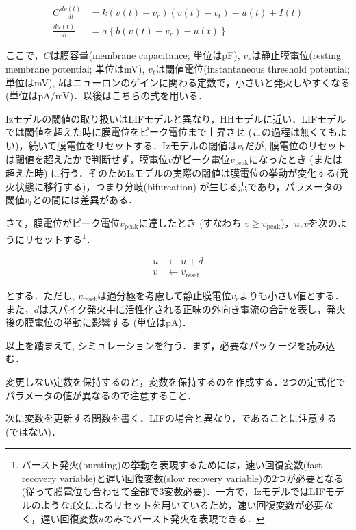 \begin{align}
C\frac{dv(t)}{dt}&=k\left(v(t)-v_r\right)\left(v(t)-v_t\right)-u(t)+I(t) \\
\frac{du(t)}{dt}&=a\left\{b\left(v(t)-v_{r}\right)-u(t)\right\}
\end{align} 


ここで，$C$は膜容量(membrane capacitance; 単位はpF), $v_r$は静止膜電位(resting membrane potential; 単位はmV), $v_t$は閾値電位(instantaneous threshold potential; 単位はmV), $k$はニューロンのゲインに関わる定数で，小さいと発火しやすくなる (単位はpA/mV)．以後はこちらの式を用いる．

Izモデルの閾値の取り扱いはLIFモデルと異なり，HHモデルに近い．LIFモデルでは閾値を超えた時に膜電位をピーク電位まで上昇させ (この過程は無くてもよい)，続いて膜電位をリセットする．Izモデルの閾値は$v_t$だが, 膜電位のリセットは閾値を超えたかで判断せず，膜電位$v$がピーク電位$v_{\text{peak}}$になったとき (または超えた時) に行う．そのためIzモデルの実際の閾値は膜電位の挙動が変化する(発火状態に移行する)，つまり分岐(bifurcation) が生じる点であり，パラメータの閾値$v_t$との間には差異がある．

さて，膜電位がピーク電位$v_{\text{peak}}$に達したとき (すなわち  $v \geq v_{\text{peak}}$)，$u, v$を次のようにリセットする\footnote{バースト発火(bursting)の挙動を表現するためには，速い回復変数(fast recovery variable)と遅い回復変数(slow recovery variable)の2つが必要となる(従って膜電位も合わせて全部で3変数必要)．一方で，IzモデルではLIFモデルのようなif文によるリセットを用いているため，速い回復変数が必要なく，遅い回復変数$u$のみでバースト発火を表現できる．}．


\begin{align} 
u&\leftarrow u+d\\
v&\leftarrow v_{\text{reset}}
\end{align}


とする．ただし, $v_{\text{reset}}$は過分極を考慮して静止膜電位$v_r$よりも小さい値とする．また，$d$はスパイク発火中に活性化される正味の外向き電流の合計を表し，発火後の膜電位の挙動に影響する (単位はpA)．

以上を踏まえて, シミュレーションを行う．まず，必要なパッケージを読み込む．

変更しない定数を保持するのと，変数を保持するのを作成する．2つの定式化でパラメータの値が異なるので注意すること．

次に変数を更新する関数を書く．LIFの場合と異なり，であることに注意する (ではない)．

